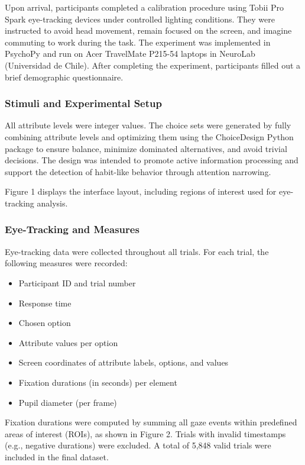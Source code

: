 Upon arrival, participants completed a calibration procedure using Tobii Pro Spark eye-tracking devices under controlled lighting conditions. They were instructed to avoid head movement, remain focused on the screen, and imagine commuting to work during the task. The experiment was implemented in PsychoPy and run on Acer TravelMate P215-54 laptops in NeuroLab (Universidad de Chile). After completing the experiment, participants filled out a brief demographic questionnaire.

\subsubsection{Stimuli and Experimental Setup}\label{stimuli-and-experimental-setup}

All attribute levels were integer values. The choice sets were generated by fully combining attribute levels and optimizing them using the ChoiceDesign Python package to ensure balance, minimize dominated alternatives, and avoid trivial decisions. The design was intended to promote active information processing and support the detection of habit-like behavior through attention narrowing.

Figure 1 displays the interface layout, including regions of interest used for eye-tracking analysis.

\subsubsection{Eye-Tracking and Measures}\label{eye-tracking-and-measures}

Eye-tracking data were collected throughout all trials. For each trial, the following measures were recorded:

\begin{itemize}
\item
  Participant ID and trial number
\item
  Response time
\item
  Chosen option
\item
  Attribute values per option
\item
  Screen coordinates of attribute labels, options, and values
\item
  Fixation durations (in seconds) per element
\item
  Pupil diameter (per frame)
\end{itemize}

Fixation durations were computed by summing all gaze events within predefined areas of interest (ROIs), as shown in Figure 2. Trials with invalid timestamps (e.g., negative durations) were excluded. A total of 5,848 valid trials were included in the final dataset.

